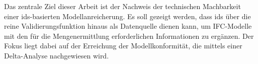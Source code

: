 Das zentrale Ziel dieser Arbeit ist der Nachweis der technischen Machbarkeit einer 
\gls{ids}-basierten Modellanreicherung. Es soll gezeigt werden, dass \gls{ids} über die reine 
Validierungsfunktion hinaus als Datenquelle dienen kann, um IFC-Modelle mit den für die Mengenermittlung 
erforderlichen Informationen zu ergänzen. Der Fokus liegt dabei auf der Erreichung der Modellkonformität, die 
mittels einer Delta-Analyse nachgewiesen wird.
